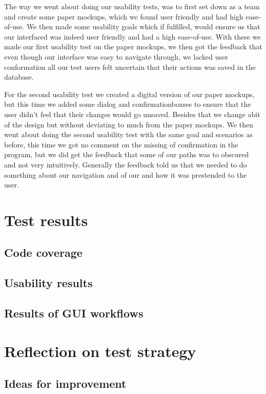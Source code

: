The way we went about doing our usability tests, was to first set down as a team and create some paper mockups, which we found user friendly and had high ease-of-use. We then made some usability goals which if fulfilled, would ensure us that our interfaced was indeed user friendly and had a high ease-of-use. With these we made our first usability test on the paper mockups, we then got the feedback that even though our interface was easy to navigate through, we lacked user conformation all our test users felt uncertain that their actions was saved in the database.

For the second usability test we created a digital version of our paper mockups, but this time we added some dialog and confirmationboxses to ensure that the user didn't feel that their changes would go unsaved. Besides that we change abit of the design but without deviating to much from the paper mockups. We then went about doing the second usability test with the same goal and scenarios as before, this time we got no comment on the missing of confirmation in the program, but we did get the feedback that some of our paths was to obscured and not very intuitively. Generally the feedback told us that we needed to do something about our navigation and of our and how it was prestended to the user.


\section{Test results}
\label{Testing_Results}

\subsection{Code coverage}
\label{Testing_Results_Coverage}

\subsection{Usability results}
\label{Testing_Results_Usability}

\subsection{Results of GUI workflows}
\label{Testing_Results_Workflows}

\section{Reflection on test strategy}
\label{Testing_Reflection}

\subsection{Ideas for improvement}
\label{Testing_Reflection_improvements}
